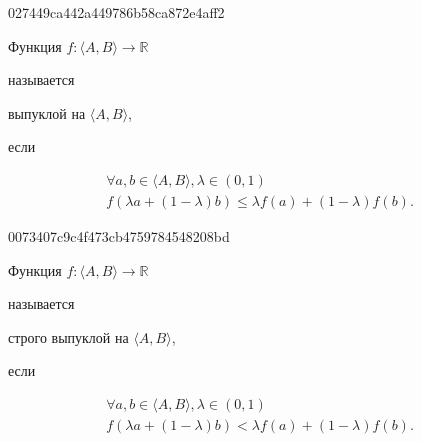 \begin{note}{027449ca442a449786b58ca872e4aff2}
    \begin{icloze}{3}Функция \( f : \langle A, B \rangle \to \mathbb R  \)\end{icloze} называется \begin{icloze}{2}выпуклой на \( \langle A, B \rangle  \),\end{icloze} если
    \begin{icloze}{1}\[
        \begin{gathered}
            \forall a, b \in \langle A, B \rangle, \lambda \in (0,1) \\
            f(\lambda a + (1 - \lambda)b) \leqslant \lambda f(a) + (1 - \lambda)f(b).
        \end{gathered}
    \]\end{icloze}
\end{note}

\begin{note}{0073407c9c4f473cb4759784548208bd}
    \begin{icloze}{3}Функция \( f : \langle A, B \rangle \to \mathbb R  \)\end{icloze} называется \begin{icloze}{2}строго выпуклой на \( \langle A, B \rangle  \),\end{icloze} если
    \begin{icloze}{1}\[
        \begin{gathered}
            \forall a, b \in \langle A, B \rangle, \lambda \in (0,1) \\
            f(\lambda a + (1 - \lambda)b) < \lambda f(a) + (1 - \lambda)f(b).
        \end{gathered}
    \]\end{icloze}
\end{note}

